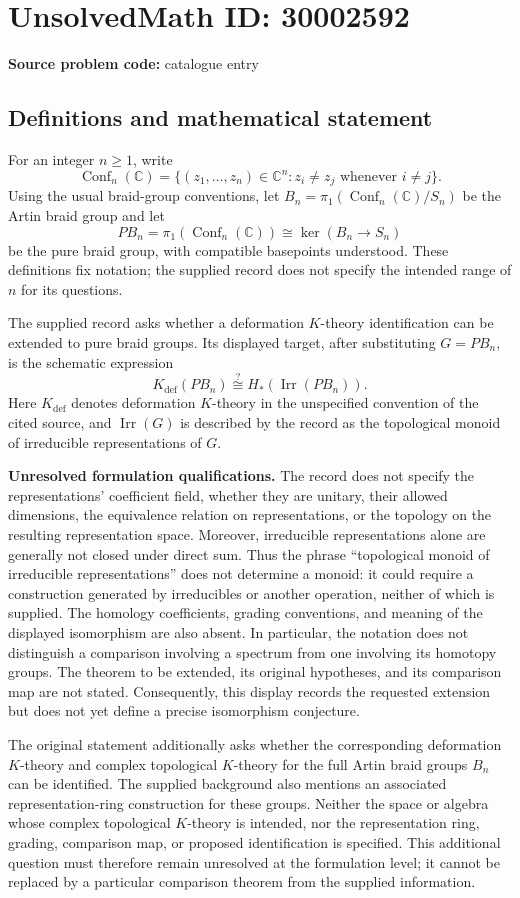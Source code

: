 \documentclass[11pt]{article}
\newcommand{\C}{\mathbb{C}}
\begin{document}
\section*{UnsolvedMath ID: 30002592}
\textbf{Source problem code:} catalogue entry
\subsection{Definitions and mathematical statement}
For an integer \(n\geq 1\), write
\[
\operatorname{Conf}_n(\C)=\{(z_1,\ldots,z_n)\in\C^n:z_i\neq z_j\text{ whenever }i\neq j\}.
\]
Using the usual braid-group conventions, let \(B_n=\pi_1(\operatorname{Conf}_n(\C)/S_n)\) be the Artin braid group and let
\[
PB_n=\pi_1(\operatorname{Conf}_n(\C))\cong\ker(B_n\longrightarrow S_n)
\]
be the pure braid group, with compatible basepoints understood. These definitions fix notation; the supplied record does not specify the intended range of \(n\) for its questions.

The supplied record asks whether a deformation \(K\)-theory identification can be extended to pure braid groups. Its displayed target, after substituting \(G=PB_n\), is the schematic expression
\[
K_{\mathrm{def}}(PB_n)\stackrel{?}{\cong}H_*(\operatorname{Irr}(PB_n)).
\]
Here \(K_{\mathrm{def}}\) denotes deformation \(K\)-theory in the unspecified convention of the cited source, and \(\operatorname{Irr}(G)\) is described by the record as the topological monoid of irreducible representations of \(G\).

\textbf{Unresolved formulation qualifications.} The record does not specify the representations' coefficient field, whether they are unitary, their allowed dimensions, the equivalence relation on representations, or the topology on the resulting representation space. Moreover, irreducible representations alone are generally not closed under direct sum. Thus the phrase ``topological monoid of irreducible representations'' does not determine a monoid: it could require a construction generated by irreducibles or another operation, neither of which is supplied. The homology coefficients, grading conventions, and meaning of the displayed isomorphism are also absent. In particular, the notation does not distinguish a comparison involving a spectrum from one involving its homotopy groups. The theorem to be extended, its original hypotheses, and its comparison map are not stated. Consequently, this display records the requested extension but does not yet define a precise isomorphism conjecture.

The original statement additionally asks whether the corresponding deformation \(K\)-theory and complex topological \(K\)-theory for the full Artin braid groups \(B_n\) can be identified. The supplied background also mentions an associated representation-ring construction for these groups. Neither the space or algebra whose complex topological \(K\)-theory is intended, nor the representation ring, grading, comparison map, or proposed identification is specified. This additional question must therefore remain unresolved at the formulation level; it cannot be replaced by a particular comparison theorem from the supplied information.
\end{document}
